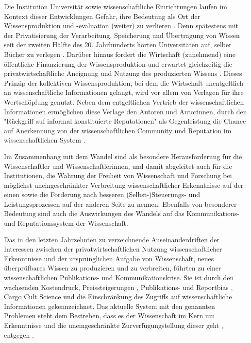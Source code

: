 Die Institution Universität sowie wissenschaftliche Einrichtungen laufen im Kontext dieser Entwicklungen Gefahr, ihre Bedeutung als Ort der Wissensproduktion und -evaluation (weiter) zu verlieren \cite[:343]{Kruecken_2001}. Denn spätestens mit der Privatisierung der Verarbeitung, Speicherung und Übertragung von Wissen seit der zweiten Hälfte des 20. Jahrhunderts hörten Universitäten auf, selber Bücher zu verlegen \cite{Jospeph_2006}. Darüber hinaus fordert die Wirtschaft (zunehmend) eine öffentliche Finanzierung der Wissensproduktion und erwartet gleichzeitig die privatwirtschaftliche Aneignung und Nutzung des produzierten Wissens \cite{Weingart_2001}. Dieses Prinzip der kollektiven Wissensproduktion, bei dem die Wirtschaft unentgeltlich an wissenschaftliche Informationen gelangt, wird vor allem von Verlagen für ihre Wertschöpfung genutzt. Neben dem entgeltlichen Vertrieb der wissenschaftlichen Informationen ermöglichen diese Verlage den Autoren und Autorinnen, durch den "Rückgriff auf informal konstituierte Reputationen" \cite[:237]{Luhmann_1970} als Gegenleistung die Chance auf Anerkennung von der wissenschaftlichen Community und Reputation im wissenschaftlichen System \cite{Bernius_2009}.

Im Zusammenhang mit dem Wandel sind als besondere Herausforderung für die Wissenschaftler und Wissenschaftlerinnen, und damit abgeleitet auch für die Institutionen, die Wahrung der Freiheit von Wissenschaft und Forschung bei möglichst uneingeschränkter Verbreitung wissenschaftlicher Erkenntnisse \cite{Hagner_2015} \cite{BBAW_2015} \cite{Buss_2001} auf der einen sowie die Forderung nach besseren (Selbst-)Steuerungs- und Leistungsprozessen \cite{Adler_2009} \cite{Gibbons_1994} auf der anderen Seite zu nennen. Ebenfalls von besonderer Bedeutung sind auch die Auswirkungen des Wandels auf das Kommunikations- und Reputationssystem der Wissenschaft.

Das in den letzten Jahrzehnten zu verzeichnende Auseinanderdriften der Interessen zwischen der privatwirtschaftlichen Nutzung wissenschaftlicher Erkenntnisse und der ursprünglichen Aufgabe von Wissenschaft, neues überprüfbares Wissen zu produzieren und zu verbreiten, führten zu einer wissenschaftlichen Publikations- und Kommunikationskrise. Sie ist durch den wachsenden Kostendruck, Preissteigerungen \cite{Lewis_2015}, Publikations- \cite{Egger_1997} \cite{Fanelli_2012} \cite{Beverungen_2012} \cite{Brembs_20013} und Reportbias \cite{Chan_2008} \cite{Dickersin_2011}, Cargo Cult Science \cite{Feynman_1974} und die Einschränkung des Zugriffs auf wissenschaftliche Informationen \cite{Hess_2006} gekennzeichnet. Das aktuelle System mit den genannten Problemen steht dem Bestreben, dass es der Wissenschaft im Kern um Erkenntnisse und die uneingeschränkte Zurverfügungstellung dieser geht \cite{Hanekop_2006}, entgegen \cite{Offhaus_2012}.

